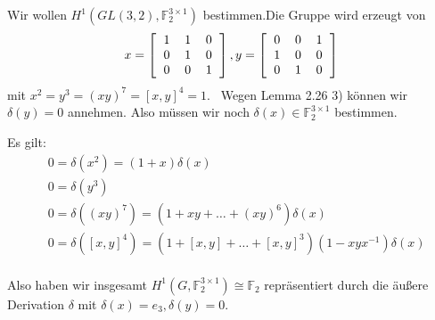 \documentclass{beamer}
\begin{document}
\begin{comment}
\begin{frame}
\begin{block}{Lemma 2.36 (Kettenregel)}
Seien $v_i$ Worte in den $x_j^{\pm 1}$ und $w$ ein Wort in den $v_i^{\pm 1}.$ Dann gilt:
\[
\frac{\delta w}{\delta x_i}=\sum_j \frac{\delta w}{\delta v_j}\frac{\delta v_j}{\delta x_i}
\]
\end{block}
\end{frame}
\begin{frame}
\begin{block}{Satz 2.37}
Sei $X=\{x_1,\ldots,x_n\}.$ Für $w\in F(X)$(freie Gruppe auf $X$) gilt:
\[
\sum_i\frac{\delta w}{\delta x_i}=w-1
\]
\end{block}
\end{frame}
\end{comment}
\begin{frame}
Wir wollen $H^1(GL(3,2),\mathbb{F}_2^{3\times 1})$ bestimmen.\pause Die Gruppe wird erzeugt von 
\[
x=\left[\begin{tabular}{ccc}
1&1&0\\
0&1&0\\
0&0&1\\
\end{tabular}\right],
y=\left[\begin{tabular}{ccc}
0&0&1\\
1&0&0\\
0&1&0\\
\end{tabular}\right]
\]
mit $x^2=y^3=(xy)^7=[x,y]^4=1.$\pause
 $\,$ Wegen Lemma 2.26  3) können wir $\delta(y)=0$ annehmen.\pause $ $ Also müssen wir noch $\delta(x)\in \mathbb{F}_2^{3\times 1}$ bestimmen.
\end{frame}
\begin{frame}
Es gilt:
\begin{align*}
&0=\delta(x^2)=(1+x)\delta(x)\\
&0=\delta(y^3)\\
&0=\delta((xy)^7)=(1+xy+\ldots+(xy)^6)\delta(x)\\
&0=\delta([x,y]^4)=(1+[x,y]+\ldots+[x,y]^3)(1-xyx^{-1})\delta(x)\\
\end{align*}
\end{frame}
\begin{frame}
Also haben wir insgesamt $H^1(G,\mathbb{F}_2^{3\times 1})\cong \mathbb{F}_2$ repräsentiert durch die äußere Derivation $\delta$ mit $\delta(x)=e_3,\delta(y)=0.$
\end{frame}
\end{document}
